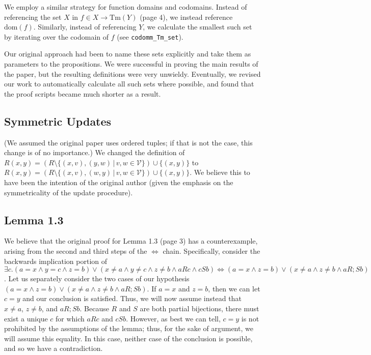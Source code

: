 \documentclass{article}
\begin{document}
We employ a similar strategy for function domains and codomains. Instead of referencing the set $X$
in $f \in X \longrightarrow \textrm{Tm}(Y)$ (page 4), we instead reference $\textrm{dom}(f)$.
Similarly, instead of referencing $Y$, we calculate the smallest such set by iterating over the
codomain of $f$ (see \verb|codomm_Tm_set|).

Our original approach had been to name these sets explicitly and take them as parameters to the
propositions. We were successful in proving the main results of the paper, but the resulting
definitions were very unwieldy. Eventually, we revised our work to automatically calculate all such
sets where possible, and found that the proof scripts became much shorter as a result.

\subsection{Symmetric Updates}

(We assumed the original paper uses ordered tuples; if that is not the case, this change is of no
importance.) We changed the definition of $R(x,y) = (R \setminus \{ (x,v),(y,w) \, | \, v,w \in
\mathcal{V} \}) \cup \{ (x,y) \}$ to $R(x,y) = (R \setminus \{ (x,v),(w,y) \, | \, v,w \in
\mathcal{V} \}) \cup \{ (x,y) \}$. We believe this to have been the intention of the original author
(given the emphasis on the symmetricality of the update procedure).

\subsection{Lemma 1.3}

We believe that the original proof for Lemma 1.3 (page 3) has a counterexample, arising from the
second and third steps of the $\iff$ chain. Specifically, consider the backwards implication portion
of $\exists c. (a = x \land y = c \land z = b) \lor (x \neq a \land y \neq c \land z \neq b \land a
R c \land c S b) \iff (a = x \land z = b) \lor (x \neq a \land z \neq b \land a R; S b)$. Let us
separately consider the two cases of our hypothesis $(a = x \land z = b) \lor (x \neq a \land z \neq
b \land a R; S b)$. If $a = x$ and $z = b$, then we can let $c = y$ and our conclusion is satisfied.
Thus, we will now assume instead that $x \neq a$, $z \neq b$, and $a R; S b$. Because $R$ and $S$
are both partial bijections, there must exist a unique $c$ for which $aRc$ and $cSb$. However, as
best we can tell, $c = y$ is not prohibited by the assumptions of the lemma; thus, for the sake of
argument, we will assume this equality. In this case, neither case of the conclusion is possible,
and so we have a contradiction.
\end{document}
